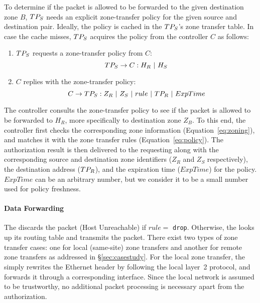 To determine if the packet is allowed to be forwarded to the given destination zone $B$, $TP_S$
needs an explicit zone-transfer policy for the given source and destination pair. Ideally, 
the policy is cached in the $TP_S$'s zone transfer table. In case the cache misses, $TP_S$ 
acquires the policy from the controller $C$ as follows:

\begin{enumerate}
	\item $TP_S$ requests a zone-transfer policy from $C$:
	      \begin{equation}
	      	TP_S \rightarrow C : H_R~|~H_S
	      	\label{eq:authreq}
	      \end{equation}
	\item $C$ replies with the zone-transfer policy:
	      \begin{equation}
	      	C \rightarrow TP_S : \\
	      	Z_R~|~Z_S~|~rule~|~TP_R~|~ExpTime
	      	\label{eq:authrep}
	      \end{equation}
\end{enumerate}

The controller consults the zone-transfer policy to see if the packet is allowed to be forwarded
to $H_R$, more specifically to destination zone $Z_B$. To this end, the controller 
first checks the corresponding zone information (Equation~\ref{eq:zoning}), and matches 
it with the zone transfer rules (Equation~\ref{eq:policy}). The authorization result is
then delivered to the requesting \tp along with the corresponding source and destination 
zone identifiers ($Z_R$ and $Z_S$ respectively), the destination \tp address 
($TP_R$), and the expiration time ($ExpTime$) for the policy. $ExpTime$ can be an arbitrary
number, but we consider it to be a small number used for policy freshness.

\paragraph{Data Forwarding}
The \tp discards the packet (Host Unreachable) if $rule=$ \texttt{drop}. Otherwise, 
the \tp looks up its routing table and transmits the packet. There exist two types of 
zone transfer cases: one for local (same-site) zone transfers and another for remote zone 
transfers as addressed in \S\ref{sec:casestudy}. For the local zone transfer, the \tp 
simply rewrites the Ethernet header by following the local layer~2 protocol, and 
forwards it through a corresponding interface. Since the local network is assumed to
be trustworthy, no additional packet processing is necessary apart from the authorization.

